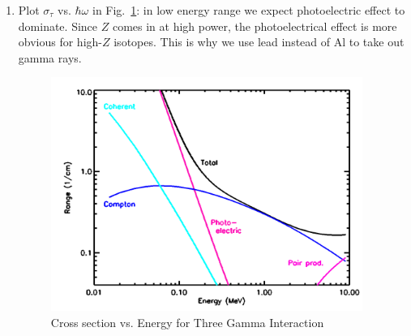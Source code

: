 \documentclass{school-22.101-notes}
\begin{document}
\begin{enumerate}
\item Plot $\sigma_{\tau}$ vs. $\hbar \omega$ in Fig.~\ref{GI}: in low energy range we expect photoelectric effect to dominate. Since $Z$ comes in at high power, the photoelectrical effect is more obvious for high-$Z$ isotopes. This is why we use lead instead of Al to take out gamma rays. 
  \begin{figure}[ht]
    \centering
    \includegraphics[width=4in]{images/ni/GI.png}
    \caption{Cross section vs. Energy for Three Gamma Interaction} \label{GI} 
  \end{figure}
\end{enumerate}
\end{document}
